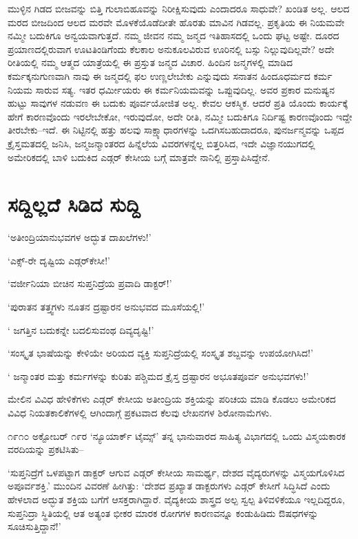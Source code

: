 
ಮುಳ್ಳಿನ ಗಿಡದ ಬೀಜವನ್ನು ಬಿತ್ತಿ ಗುಲಾಬಿಹೂವನ್ನು ನಿರೀಕ್ಷಿಸುವುದು ಎಂದಾದರೂ ಸಾಧುವೇ? ಖಂಡಿತ ಅಲ್ಲ. ಆಲದ ಮರದ ಬೀಜದಿಂದ ಆಲದ ಮರವೇ ಮೊಳಕೆಯೊಡೆದೀತೇ ಹೊರತು ಮಾವಿನ ಗಿಡವಲ್ಲ. ಪ್ರಕೃತಿಯ ಈ ನಿಯಮವೇ ನಮ್ಮೀ ಬದುಕಿಗೂ ಅನ್ವಯವಾಗುತ್ತದೆ. ನಮ್ಮ ಜೀವನ ನಮ್ಮ ಜನ್ಮದ ಇತಿಹಾಸದಲ್ಲಿ ಒಂದು ಘಟ್ಟ ಅಷ್ಟೇ. ದೂರದ ಪ್ರಯಾಣದಲ್ಲಿರುವಾಗ ಊಟತಿಂಡಿಗೆಂದು ಕೆಲಕಾಲ ಅನುಕೂಲವಿರುವ ಊರಿನಲ್ಲಿ ಬಸ್ಸು ನಿಲ್ಲುವುದಿಲ್ಲವೇ? ಅದೇ ರೀತಿಯಲ್ಲಿ ನಮ್ಮ ಆತ್ಮದ ಯಾತ್ರೆಯಲ್ಲಿ ಈ ಪ್ರಸ್ತುತ ಜನ್ಮದ ವಿಚಾರ. ಹಿಂದಿನ ಜನ್ಮಗಳಲ್ಲಿ ಮಾಡಿದ ಕರ್ಮಕ್ಕನುಗುಣವಾಗಿ ನಾವು ಈ ಜನ್ಮದಲ್ಲಿ ಫಲ ಉಣ್ಣಲೇಬೇಕು ಎನ್ನುವುದು ಸನಾತನ ಹಿಂದೂಧರ್ಮದ ಕರ್ಮ ನಿಯಮ ಸಾರುವ ಸತ್ಯ. ಇತರ ಧರ್ಮೀಯರು ಈ ಕರ್ಮನಿಯಮವನ್ನು ಒಪ್ಪುವುದಿಲ್ಲ. ಅವರ ಪ್ರಕಾರ ಮನುಷ್ಯನ ಹುಟ್ಟು ಸಾವುಗಳ ನಡುವಣ ಈ ಬದುಕು ಪೂರ್ವಯೋಜಿತ ಅಲ್ಲ. ಕೇವಲ ಆಕಸ್ಮಿಕ. ಆದರೆ ಪ್ರತಿ ಯೊಂದು ಕಾರ್ಯಕ್ಕೆ ಹೇಗೆ ಕಾರಣವೊಂದು ಇರಲೇಬೇಕೋ, ಇರುವುದೋ, ಅದೇ ರೀತಿ, ನಮ್ಮೀ ಬದುಕಿಗೂ ನಿರ್ದಿಷ್ಟ ಕಾರಣವೊಂದು ಇದ್ದೇ ತೀರಬೇಕು–ಇದೆ. ಈ ನಿಟ್ಟಿನಲ್ಲಿ ಹತ್ತು ಹಲವು ಸಾಕ್ಷ್ಯಾಧಾರಗಳನ್ನು ಒದಗಿಸಬಹುದಾದರೂ, ಪುನರ್ಜನ್ಮವನ್ನು ಒಪ್ಪದ ಕ್ರೈಸ್ತಮತದಲ್ಲಿ ಜನಿಸಿ, ಜನ್ಮಜನ್ಮಾಂತರದ ಹಿನ್ನೆಲೆಯ ವಿವರಗಳನ್ನೆಲ್ಲ ಬಿತ್ತರಿಸಿದ, ಇದೇ ವಿಜ್ಞಾನಯುಗದಲ್ಲಿ ಅಮೇರಿಕದಲ್ಲಿ ಬಾಳಿ ಬದುಕಿದ ಎಡ್ಗರ್ ಕೇಸೀಯ ಬಗ್ಗೆ ಮಾತ್ರವೇ ನಾನಿಲ್ಲಿ ಪ್ರಸ್ತಾಪಿಸಿದ್ದೇನೆ.


\section*{ಸದ್ದಿಲ್ಲದೆ ಸಿಡಿದ ಸುದ್ದಿ}


‘ಅತೀಂದ್ರಿಯಾನುಭವಗಳ ಅದ್ಭುತ ದಾಖಲೆಗಳು!’

‘ಎಕ್ಸ್​-ರೇ ದೃಷ್ಟಿಯ ಎಡ್ಗರ್​ಕೇಸೀ!’

‘ವರ್ಜೀನಿಯಾ ಬೀಚಿನ ಸುಪ್ತನಿದ್ರೆಯ ಪ್ರವಾದಿ ಡಾಕ್ಟರ್​!’

‘ಪುರಾತನ ತತ್ತ್ವಗಳು ನೂತನ ದ್ರಷ್ಟಾರನ ಅನುಭವದ ಮೂಸೆಯಲ್ಲಿ!’

‘ ಜಗತ್ತಿನ ಬದುಕನ್ನೇ ಬದಲಿಸುವಂಥ ದಿವ್ಯದೃಷ್ಟಿ!’

‘ಸಂಸ್ಕೃತ ಭಾಷೆಯನ್ನು ಕೇಳಿಯೇ ಅರಿಯದ ವ್ಯಕ್ತಿ ಸುಪ್ತನಿದ್ರೆಯಲ್ಲಿ ಸಂಸ್ಕೃತ ಶಬ್ದವನ್ನು ಉಪಯೋಗಿಸಿದ!’

‘ ಜನ್ಮಾಂತರ ಮತ್ತು ಕರ್ಮಗಳನ್ನು ಕುರಿತು ಪಶ್ಚಿಮದ ಕ್ರೈಸ್ತ ದ್ರಷ್ಟಾರನ ಅಭೂತಪೂರ್ವ ಅನುಭವಗಳು!’

ಮೇಲಿನ ವಿವಿಧ ಹೇಳಿಕೆಗಳು ಎಡ್ಗರ್ ಕೇಸೀಯ ಅತೀಂದ್ರಿಯ ಶಕ್ತಿಯನ್ನು ಪರಿಚಯ ಮಾಡಿ ಕೊಡಲು ಅಮೇರಿಕದ ವಿವಿಧ ನಿಯತಕಾಲಿಕೆಗಳಲ್ಲಿ ಆಗಿಂದಾಗ್ಗೆ ಪ್ರಕಟವಾದ ಕೆಲವು ಲೇಖನಗಳ ಶಿರೋನಾಮೆಗಳು.

೧೯೧೦ ಅಕ್ಟೋಬರ್ ೧೯ರ ‘ನ್ಯೂಯಾರ್ಕ್ ಟೈಮ್ಸ್’ ತನ್ನ ಭಾನುವಾರದ ಸಾಹಿತ್ಯ ವಿಭಾಗದಲ್ಲಿ ಒಂದು ವಿಸ್ಮಯಕಾರಕ ವರದಿಯನ್ನು ಪ್ರಕಟಿಸಿತು–

‘ಸುಪ್ತನಿದ್ರೆಗೆ ಒಳಪಟ್ಟಾಗ ಡಾಕ್ಟರ್ ಆಗುವ ಎಡ್ಗರ್ ಕೇಸೀಯ ಸಾಮರ್ಥ್ಯ, ದೇಶದ ವೈದ್ಯರುಗಳನ್ನು ವಿಸ್ಮಯಗೊಳಿಸಿದ ಅಪೂರ್ವಶಕ್ತಿ.’ ಮುಂದಿನ ವಿವರಣೆ ಹೀಗಿತ್ತು: ‘ದೇಶದ ಪ್ರಖ್ಯಾತ ಡಾಕ್ಟರುಗಳು ಎಡ್ಗರ್ ಕೇಸೀಗೆ ಸಿದ್ಧಿಸಿದೆ ಎಂದು ಹೇಳಲಾದ ಅದ್ಭುತ ಶಕ್ತಿಯ ಬಗೆಗೆ ಆಸಕ್ತರಾಗಿದ್ದಾರೆ. ವೈದ್ಯಕೀಯ ಶಾಸ್ತ್ರದ ಅಲ್ಪ ಸ್ವಲ್ಪ ತಿಳಿವಳಿಕೆಯೂ ಇಲ್ಲದಿದ್ದರೂ, ಸುಪ್ತನಿದ್ರಾ ಸ್ಥಿತಿಯಲ್ಲಿ ಆತ ಅತ್ಯಂತ ಭೀಕರ ಮಾರಕ ರೋಗಗಳ ಕಾರಣವನ್ನೂ ಕಂಡುಹಿಡಿದು ಔಷಧಗಳನ್ನು ಸೂಚಿಸುತ್ತಿದ್ದಾನೆ!’

